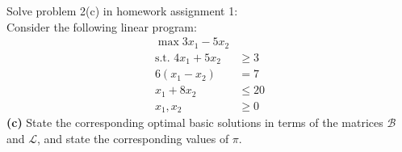 \documentclass[fleqn]{homework}
\begin{document}
  \maketitle

  \begin{problem}{1}
    \begin{question}
      Solve problem 2(c) in homework assignment 1:\\
      Consider the following linear program:
      \begin{align*}
        \max 3x_1 - 5x_2 & \\
        \text{s.t.  } 4x_1 + 5x_2 &\ge 3 \\
        6(x_1 - x_2) &= 7 \\
        x_1 + 8x_2 &\le 20 \\
        x_1, x_2 &\ge 0
      \end{align*}
      \textbf{(c)} State the corresponding optimal basic solutions in terms of
      the matrices $\mathcal{B}$ and $\mathcal{L}$, and state the corresponding
      values of $\pi$.
    \end{question}
  \end{problem}
\end{document}
